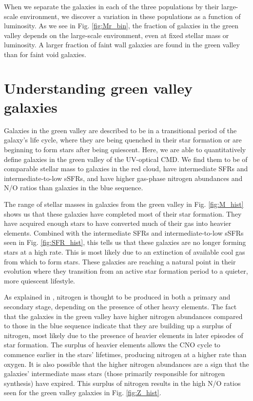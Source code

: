 When we separate the galaxies in each of the three populations by their 
large-scale environment, we discover a variation in these populations as a 
function of luminosity.  As we see in Fig. \ref{fig:Mr_bin}, the fraction of 
galaxies in the green valley depends on the large-scale environment, even at 
fixed stellar mass or luminosity.  A larger fraction of faint wall galaxies are 
found in the green valley than for faint void galaxies.




\section[GV galaxy properties]{Understanding green valley galaxies}\label{sec:discussion_GV}

Galaxies in the green valley are described to be in a transitional period of the 
galaxy's life cycle, where they are being quenched in their star formation or 
are beginning to form stars after being quiescent.  Here, we are able to 
quantitatively define galaxies in the green valley of the UV-optical CMD.  We 
find them to be of comparable stellar mass to galaxies in the red cloud, have 
intermediate SFRs and intermediate-to-low sSFRs, and have higher gas-phase 
nitrogen abundances and N/O ratios than galaxies in the blue sequence.

The range of stellar masses in galaxies from the green valley in Fig. 
\ref{fig:M_hist} shows us that these galaxies have completed most of their star 
formation.  They have acquired enough stars to have converted much of their gas 
into heavier elements.  Combined with the intermediate SFRs and 
intermediate-to-low sSFRs seen in Fig. \ref{fig:SFR_hist}, this tells us that 
these galaxies are no longer forming stars at a high rate.  This is most likely 
due to an extinction of available cool gas from which to form stars.  These 
galaxies are reaching a natural point in their evolution where they transition 
from an active star formation period to a quieter, more quiescent lifestyle.

As explained in \cite{Douglass17b}, nitrogen is thought to be produced in both a 
primary and secondary stage, depending on the presence of other heavy elements.  
The fact that the galaxies in the green valley have higher nitrogen abundances 
compared to those in the blue sequence indicate that they are building up a 
surplus of nitrogen, most likely due to the presence of heavier elements in 
later episodes of star formation.  The surplus of heavier elements allows the 
CNO cycle to commence earlier in the stars' lifetimes, producing nitrogen at a 
higher rate than oxygen.  It is also possible that the higher nitrogen 
abundances are a sign that the galaxies' intermediate mass stars (those 
primarily responsible for nitrogen synthesis) have expired.  This surplus of 
nitrogen results in the high N/O ratios seen for the green valley galaxies in 
Fig. \ref{fig:Z_hist}.

